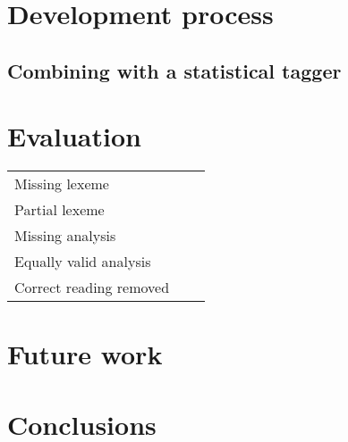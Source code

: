 \documentclass[11pt]{article}
\begin{document}
\section{Development process}

\subsection{Combining with a statistical tagger}

\section{Evaluation}

\begin{table}
  \centering
  \begin{tabular}{|l|r|r|}
    \hline
    Missing lexeme & &  \\          %
    Partial lexeme & &  \\          %
    Missing analysis & &  \\        %
    Equally valid analysis & & \\   %
    Correct reading removed & &  \\ %
    \hline
  \end{tabular}

\end{table}



\section{Future work}


\section{Conclusions}


%



\end{document}
